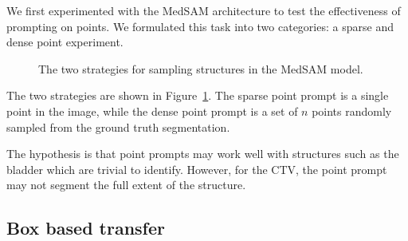 \documentclass[12pt,twoside]{report}
\begin{document}
We first experimented with the MedSAM architecture to test the effectiveness of prompting on points. We formulated this task into two categories: a sparse and dense point experiment. 

\begin{figure}[H]
  \centering
  \caption{The two strategies for sampling structures in the MedSAM model.}\label{fig:point-prompt}
\end{figure}

The two strategies are shown in Figure~\ref{fig:point-prompt}. The sparse point prompt is a single point in the image, while the dense point prompt is a set of $n$ points randomly sampled from the ground truth segmentation.

The hypothesis is that point prompts may work well with structures such as the bladder which are trivial to identify. However, for the CTV, the point prompt may not segment the full extent of the structure.

\subsection{Box based transfer}
\end{document}
